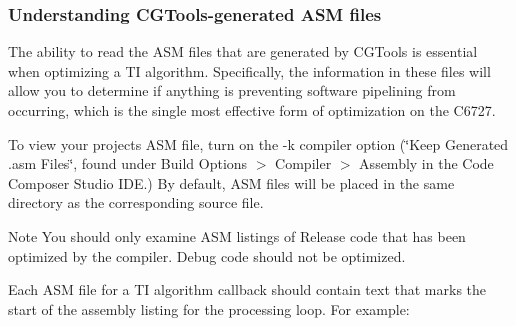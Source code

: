 \hypertarget{a00832_subsection__understanding_cgtoolsgenerated_asm_files}{}\subsubsection{Understanding C\+G\+Tools-\/generated A\+S\+M files}\label{a00832_subsection__understanding_cgtoolsgenerated_asm_files}
 The ability to read the A\+SM files that are generated by C\+G\+Tools is essential when optimizing a TI algorithm. Specifically, the information in these files will allow you to determine if anything is preventing software pipelining from occurring, which is the single most effective form of optimization on the C6727.

To view your project\textquotesingle{}s A\+SM file, turn on the {\ttfamily -\/k} compiler option (\char`\"{}\+Keep Generated .\+asm Files\char`\"{}, found under Build Options $>$ Compiler $>$ Assembly in the Code Composer Studio I\+DE.) By default, A\+SM files will be placed in the same directory as the corresponding source file.

\begin{DoxyNote}{Note}
You should only examine A\+SM listings of Release code that has been optimized by the compiler. Debug code should not be optimized.
\end{DoxyNote}
Each A\+SM file for a TI algorithm callback should contain text that marks the start of the assembly listing for the processing loop. For example\+:


